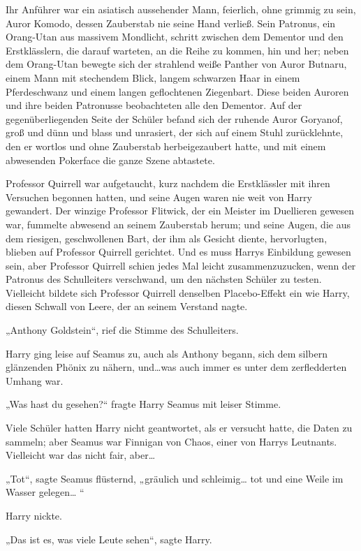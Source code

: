 {Ihr Anführer war ein asiatisch aussehender Mann, feierlich, ohne grimmig zu sein, Auror Komodo, dessen Zauberstab nie seine Hand verließ. Sein Patronus, ein Orang-Utan aus massivem Mondlicht, schritt zwischen dem Dementor und den Erstklässlern, die darauf warteten, an die Reihe zu kommen, hin und her; neben dem Orang-Utan bewegte sich der strahlend weiße Panther von Auror Butnaru, einem Mann mit stechendem Blick, langem schwarzen Haar in einem Pferdeschwanz und einem langen geflochtenen Ziegenbart. Diese beiden Auroren und ihre beiden Patronusse beobachteten alle den Dementor. Auf der gegenüberliegenden Seite der Schüler befand sich der ruhende Auror Goryanof, groß und dünn und blass und unrasiert, der sich auf einem Stuhl zurücklehnte, den er wortlos und ohne Zauberstab herbeigezaubert hatte, und mit einem abwesenden Pokerface die ganze Szene abtastete.

Professor Quirrell war aufgetaucht, kurz nachdem die Erstklässler mit ihren Versuchen begonnen hatten, und seine Augen waren nie weit von Harry gewandert. Der winzige Professor Flitwick, der ein Meister im Duellieren gewesen war, fummelte abwesend an seinem Zauberstab herum; und seine Augen, die aus dem riesigen, geschwollenen Bart, der ihm als Gesicht diente, hervorlugten, blieben auf Professor Quirrell gerichtet. Und es muss Harrys Einbildung gewesen sein, aber Professor Quirrell schien jedes Mal leicht zusammenzuzucken, wenn der Patronus des Schulleiters verschwand, um den nächsten Schüler zu testen. Vielleicht bildete sich Professor Quirrell denselben Placebo-Effekt ein wie Harry, diesen Schwall von Leere, der an seinem Verstand nagte.

„Anthony Goldstein“, rief die Stimme des Schulleiters.

Harry ging leise auf Seamus zu, auch als Anthony begann, sich dem silbern glänzenden Phönix zu nähern, und…was auch immer es unter dem zerfledderten Umhang war.

„Was hast du gesehen?“ fragte Harry Seamus mit leiser Stimme.

Viele Schüler hatten Harry nicht geantwortet, als er versucht hatte, die Daten zu sammeln; aber Seamus war Finnigan von Chaos, einer von Harrys Leutnants. Vielleicht war das nicht fair, aber…

„Tot“, sagte Seamus flüsternd, „gräulich und schleimig… tot und eine Weile im Wasser gelegen… “

Harry nickte.

„Das ist es, was viele Leute sehen“, sagte Harry.

}
